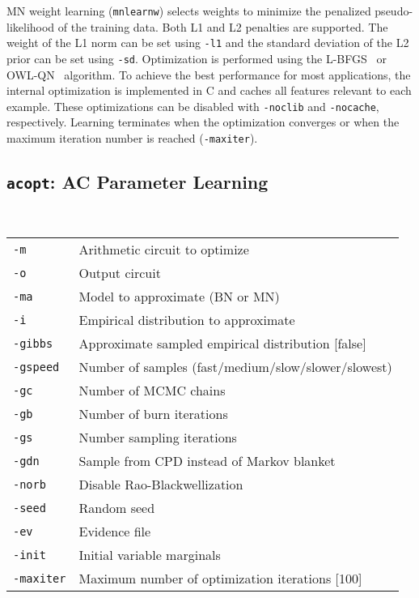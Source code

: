 \documentclass[11pt]{article}
\begin{document}
MN weight learning ({\tt mnlearnw}) selects weights to
minimize the penalized pseudo-likelihood of the training data.  Both
L1 and L2 penalties are supported.  The weight of the L1 norm can be
set using {\tt -l1} and the standard deviation of the L2 prior can be
set using {\tt -sd}.  Optimization is performed using the
L-BFGS~\cite{liu&nocedal89} or OWL-QN~\cite{andrew&gao07} algorithm.
To achieve the best performance for most applications, the internal
optimization is implemented in C and caches all features relevant to
each example.  These optimizations can be disabled with {\tt -noclib}
and {\tt -nocache}, respectively.  Learning terminates when the
optimization converges or when the maximum iteration number is reached
({\tt -maxiter}).

\subsection{{\tt acopt}: AC Parameter Learning} \label{sec:acopt}

\noindent {} \\
\begin{tabular}{ll}
{\tt -m} &        Arithmetic circuit to optimize \\
{\tt -o} &        Output circuit \\
{\tt -ma} &       Model to approximate (BN or MN) \\
{\tt -i} &        Empirical distribution to approximate \\
{\tt -gibbs} &    Approximate sampled empirical distribution [false] \\
{\tt -gspeed} &   Number of samples (fast/medium/slow/slower/slowest) \\
{\tt -gc} &       Number of MCMC chains  \\
{\tt -gb} &       Number of burn iterations \\
{\tt -gs} &       Number sampling iterations \\
{\tt -gdn} &      Sample from CPD instead of Markov blanket \\
{\tt -norb} &     Disable Rao-Blackwellization \\
{\tt -seed} &     Random seed \\
{\tt -ev} &       Evidence file \\
{\tt -init} &     Initial variable marginals \\
{\tt -maxiter} &  Maximum number of optimization iterations [100] \\
\end{tabular} \\
\end{document}
